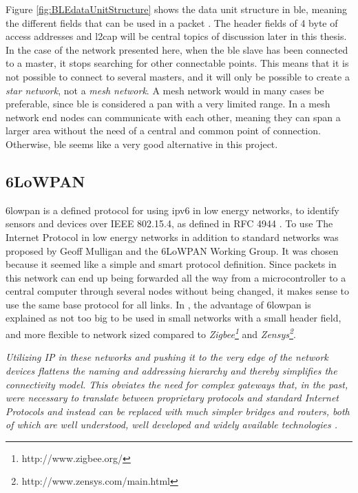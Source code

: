 \noindent Figure \ref{fig:BLEdataUnitStructure} shows the data unit structure in \gls{ble}, meaning the different fields that can be used in a packet \cite{gomez2012overview}. The header fields of 4 \gls{byte} of access addresses and \gls{l2cap} will be central topics of discussion later in this thesis. In the case of the network presented here, when the \gls{ble} slave has been connected to a master, it stops searching for other connectable points. This means that it is not possible to connect to several masters, and it will only be possible to create a \textit{star network}, not a \textit{mesh network}. A mesh network would in many cases be preferable, since \gls{ble} is considered a \gls{pan} with a very limited range. In a mesh network end nodes can communicate with each other, meaning they can span a larger area without the need of a central and common point of connection. Otherwise, \gls{ble} seems like a very good alternative in this project. 


\subsection{6LoWPAN}

\noindent \gls{6lowpan} is a defined protocol for using \gls{ipv6} in low energy networks, to identify sensors and devices over  IEEE 802.15.4, as defined in RFC 4944 \cite{montenegro2007transmission}. To use The Internet Protocol in low energy networks in addition to standard networks was proposed by Geoff Mulligan and the 6LoWPAN Working Group\cite{mulligan20076lowpan}. It was chosen because it seemed like a simple and smart protocol definition. Since packets in this network can end up being forwarded all the way from a \gls{microcontroller} to a central computer through several nodes without being changed, it makes sense to use the same base protocol for all links. In \cite{mulligan20076lowpan}, the advantage of \gls{6lowpan} is explained as not too big to be used in small networks with a small header field, and more flexible to network sized compared to \textit{Zigbee\footnote{http://www.zigbee.org/}} and \textit{Zensys\footnote{http://www.zensys.com/main.html}}. 

\noindent\textit{Utilizing IP  in these networks and pushing it to the very edge of the network devices flattens the naming and addressing hierarchy and  thereby  simplifies  the  connectivity  model. This obviates the need  for  complex  gateways  that,  in  the  past,  were  necessary  to translate   between   proprietary   protocols   and   standard   Internet Protocols and instead can be replaced with much simpler bridges and  routers,  both  of  which  are  well  understood, well  developed and  widely  available  technologies \cite{mulligan20076lowpan}.}



